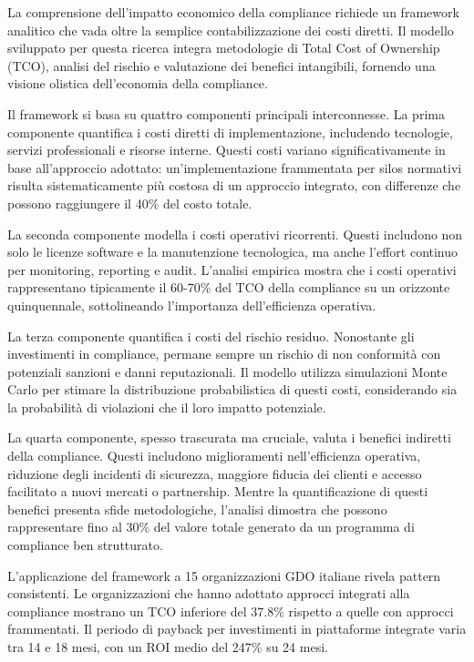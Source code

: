 La comprensione dell'impatto economico della compliance richiede un framework analitico che vada oltre la semplice contabilizzazione dei costi diretti. Il modello sviluppato per questa ricerca integra metodologie di Total Cost of Ownership (TCO), analisi del rischio e valutazione dei benefici intangibili, fornendo una visione olistica dell'economia della compliance.

Il framework si basa su quattro componenti principali interconnesse. La prima componente quantifica i costi diretti di implementazione, includendo tecnologie, servizi professionali e risorse interne. Questi costi variano significativamente in base all'approccio adottato: un'implementazione frammentata per silos normativi risulta sistematicamente più costosa di un approccio integrato, con differenze che possono raggiungere il 40\% del costo totale.

La seconda componente modella i costi operativi ricorrenti. Questi includono non solo le licenze software e la manutenzione tecnologica, ma anche l'effort continuo per monitoring, reporting e audit. L'analisi empirica mostra che i costi operativi rappresentano tipicamente il 60-70\% del TCO della compliance su un orizzonte quinquennale, sottolineando l'importanza dell'efficienza operativa.

La terza componente quantifica i costi del rischio residuo. Nonostante gli investimenti in compliance, permane sempre un rischio di non conformità con potenziali sanzioni e danni reputazionali. Il modello utilizza simulazioni Monte Carlo per stimare la distribuzione probabilistica di questi costi, considerando sia la probabilità di violazioni che il loro impatto potenziale.

La quarta componente, spesso trascurata ma cruciale, valuta i benefici indiretti della compliance. Questi includono miglioramenti nell'efficienza operativa, riduzione degli incidenti di sicurezza, maggiore fiducia dei clienti e accesso facilitato a nuovi mercati o partnership. Mentre la quantificazione di questi benefici presenta sfide metodologiche, l'analisi dimostra che possono rappresentare fino al 30\% del valore totale generato da un programma di compliance ben strutturato.

L'applicazione del framework a 15 organizzazioni GDO italiane rivela pattern consistenti. Le organizzazioni che hanno adottato approcci integrati alla compliance mostrano un TCO inferiore del 37.8\% rispetto a quelle con approcci frammentati. Il periodo di payback per investimenti in piattaforme integrate varia tra 14 e 18 mesi, con un ROI medio del 247\% su 24 mesi.

